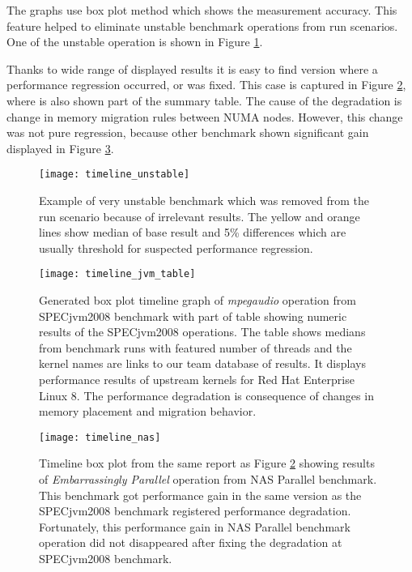 The graphs use box plot method which shows the measurement accuracy. This
feature helped to eliminate unstable benchmark operations from run scenarios.
One of the unstable operation is shown in Figure \ref{fig:timeline_unstable}.

Thanks to wide range of displayed results it is easy to find version where a
performance regression occurred, or was fixed. This case is captured in Figure
\ref{fig:timeline_jvm_table}, where is also shown part of the summary table. The
cause of the degradation is change in memory migration rules between NUMA nodes.
However, this change was not pure regression, because other benchmark shown
significant gain displayed in Figure \ref{fig:timeline_nas}. 

\begin{figure}
  \centering
  \texttt{[image: timeline\_unstable]}
  \caption{Example of very unstable benchmark which was removed from the run
    scenario because of irrelevant results. The yellow and orange lines show
    median of base result and 5\% differences which are usually threshold for
    suspected performance regression.}
  \label{fig:timeline_unstable}
\end{figure}

\begin{figure}
  \centering
  \texttt{[image: timeline\_jvm\_table]}
  \caption{Generated box plot timeline graph of \emph{mpegaudio} operation from
    SPECjvm2008 benchmark with part of table showing numeric results of the
    SPECjvm2008 operations. The table shows medians from benchmark runs with
    featured number of threads and the kernel names are links to our team
    database of results. It displays performance results of upstream kernels for
    Red Hat Enterprise Linux 8. The performance degradation is consequence of
    changes in memory placement and migration behavior.}
  \label{fig:timeline_jvm_table}
\end{figure}

\begin{figure}
  \centering
  \texttt{[image: timeline\_nas]}
  \caption{Timeline box plot from the same report as Figure
    \ref{fig:timeline_jvm_table} showing results of \emph{Embarrassingly
    Parallel} operation from NAS Parallel benchmark. This benchmark got
    performance gain in the same version as the SPECjvm2008 benchmark registered
    performance degradation. Fortunately, this performance gain in NAS Parallel
    benchmark operation did not disappeared after fixing the degradation at
    SPECjvm2008 benchmark.}
  \label{fig:timeline_nas}
\end{figure}



